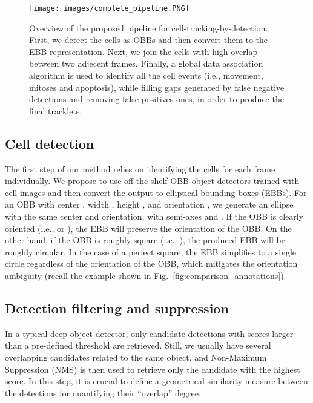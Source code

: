 \documentclass{article}
\begin{document}
\begin{figure*}[]
    \centering
    \texttt{[image: images/complete\_pipeline.PNG]}
    \caption[Overview of the proposed pipeline for cell-tracking-by-detection.]{Overview of the proposed pipeline for cell-tracking-by-detection. First, we detect the cells as OBBs and then convert them to the EBB representation. Next, we join the cells with high overlap between two adjecent frames. Finally, a global data association algorithm is used to identify all the cell events (i.e., movement, mitoses and apoptosis), while filling gaps generated by false negative detections and removing false positives ones, in order to produce the final tracklets.}
    \label{fig:complete_pipeline}
\end{figure*}

\subsection{Cell detection}

The first step of our method relies on identifying the cells for each frame individually. 
We propose to use off-the-shelf OBB object detectors trained with cell images and then convert the output to elliptical bounding boxes (EBBs). For an OBB with center , width , height , and orientation , we generate an ellipse with the same center and orientation, with semi-axes  and . If the OBB is clearly oriented (i.e.,  or ), the EBB will preserve the orientation of the OBB. On the other hand, if the OBB is roughly square (i.e., ), the produced EBB will be roughly circular. In the case of a perfect square, the EBB simplifies to a single circle regardless of the orientation of the OBB, which mitigates the orientation ambiguity (recall the example shown in Fig.~\ref{fig:comparison_annotations}).


\subsection{Detection filtering and suppression}
\label{sec:detection_filtering}

In a typical deep object detector, only candidate detections with scores larger than a pre-defined threshold  are retrieved. Still, we usually have several overlapping candidates related to the same object, and Non-Maximum Suppression (NMS) is then used to retrieve only the candidate with the highest score. In this step, it is crucial to define a geometrical similarity measure between the detections for quantifying their ``overlap'' degree. 
\end{document}
